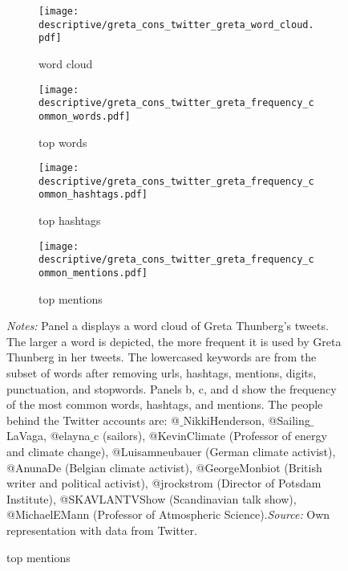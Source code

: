 


\begin{landscape}
	\vspace*{\fill}
	\begin{figure}[H]
		\centering
		\caption{Most widely used words, hashtags, and mentions in Greta Thunberg's 2019 tweets}
		\label{fig_greta_cons:twitter_greta_thunberg_top_words_hashtags_mentions}
		
		\begin{subfigure}[h]{0.4\linewidth}\centering\caption{word cloud}
			\texttt{[image: descriptive/greta\_cons\_twitter\_greta\_word\_cloud.pdf]}
		\end{subfigure}
		\begin{subfigure}[h]{0.4\linewidth}\centering\caption{top words}
			\texttt{[image: descriptive/greta\_cons\_twitter\_greta\_frequency\_common\_words.pdf]}
		\end{subfigure}
	
		\begin{subfigure}[h]{0.4\linewidth}\centering\caption{top hashtags}
			\texttt{[image: descriptive/greta\_cons\_twitter\_greta\_frequency\_common\_hashtags.pdf]}
		\end{subfigure}
		\begin{subfigure}[h]{0.4\linewidth}\centering\caption{top mentions}
			\texttt{[image: descriptive/greta\_cons\_twitter\_greta\_frequency\_common\_mentions.pdf]}
		\end{subfigure}
		\scriptsize
		\begin{minipage}{0.95\linewidth}
			\scriptsize{\emph{Notes:} Panel a displays a word cloud of Greta Thunberg's tweets. The larger a word is depicted, the more frequent it is used by Greta Thunberg in her tweets. The lowercased keywords are from the subset of words after removing urls, hashtags, mentions, digits, punctuation, and stopwords. Panels b, c, and d show the frequency of the most common words, hashtags, and mentions. The people behind the Twitter accounts are: @$\_$NikkiHenderson, @Sailing$\_$LaVaga, @elayna$\_$c (sailors), @KevinClimate (Professor of energy and climate change), @Luisamneubauer (German climate activist), @AnunaDe (Belgian climate activist), @GeorgeMonbiot (British writer and political activist), @jrockstrom (Director of Potsdam Institute), @SKAVLANTVShow (Scandinavian talk show), @MichaelEMann (Professor of Atmospheric Science).\newline\emph{Source:} Own representation with data from Twitter.}
		\end{minipage}
	\end{figure}
	\vspace*{\fill}\clearpage
\end{landscape}

